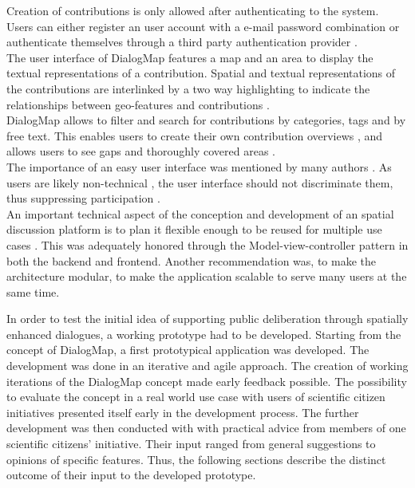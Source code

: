 Creation of contributions is only allowed after authenticating to the system. Users can either register an user account with a e-mail password combination or authenticate themselves through a third party authentication provider \cite{Sani2011_Scalable_Argumap,chun2014usability}.\\
The user interface of DialogMap features a map and an area to display the textual representations of a contribution. Spatial and textual representations of the contributions are interlinked by a two way highlighting to indicate the relationships between geo-features and contributions \cite{Cai2009_spatial_annotation_deliberation,Sidlar2009-AssessmentMapGeocollaborationTool}.\\
DialogMap allows to filter and search for contributions by categories, tags and by free text. This enables users to create their own contribution overviews \cite{Voss2004_Evolution_PGIS,you2009_participatory_map_based}, and allows users to see gaps and thoroughly covered areas \cite{Hopfer2007_Communication}.\\
The importance of an easy user interface was mentioned by many authors \cite{Rinner2009_Web2_argumap,Jankowski2005_community_based_pgis,Tang2005_PPGIS_discussion_forum,zhao2006geodf,you2009_participatory_map_based}. As users are likely non-technical \cite{Cai2009_spatial_annotation_deliberation}, the user interface should not discriminate them, thus suppressing participation \cite{Carver2001_PPGIS_Cyberdemocracy}.\\
An important technical aspect of the conception and development of an spatial discussion platform is to plan it flexible enough to be reused for multiple use cases \cite{Kessler2005_Conflict_Resolution,Kessler2005_ArgumentationMapPrototype,Sani2011_Scalable_Argumap}. This was adequately honored through the Model-view-controller pattern in both the backend and frontend. Another recommendation was, to make the architecture modular, to make the application scalable \cite{Sani2011_Scalable_Argumap} to serve many users at the same time.

In order to test the initial idea of supporting public deliberation through spatially enhanced dialogues, a working prototype had to be developed. Starting from the concept of DialogMap, a first prototypical application was developed. The development was done in an iterative and agile approach. The creation of working iterations of the DialogMap concept made early feedback possible. The possibility to evaluate the concept in a real world use case with users of scientific citizen initiatives presented itself early in the development process. The further development was then conducted with with practical advice from members of one scientific citizens' initiative. Their input ranged from general suggestions to opinions of specific features. Thus, the following sections describe the distinct outcome of their input to the developed prototype.

